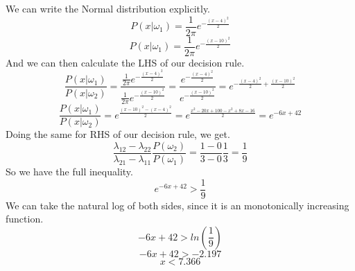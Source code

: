 \documentclass[12pt]{article}
\begin{document}
    We can write the Normal distribution explicitly.
    \[
        P(x|\omega_{1}) = \frac{1}{2\pi}e^{-\frac{(x-4)^{2}}{2}}
    \]
    \[
        P(x|\omega_{1}) = \frac{1}{2\pi}e^{-\frac{(x-10)^{2}}{2}}
    \]
    And we can then calculate the LHS of our decision rule.
    \[
        \frac{P(x|\omega_{1})}{P(x|\omega_{2})} 
        = \frac
        { \frac{1}{2\pi}e^{-\frac{(x-4)^{2}}{2}} }
        { \frac{1}{2\pi}e^{-\frac{(x-10)^{2}}{2}} }
        = \frac
        {e^{-\frac{(x-4)^{2}}{2}}}
        {e^{-\frac{(x-10)^{2}}{2}}}
        = e^{-\frac{(x-4)^{2}}{2} + \frac{(x-10)^{2}}{2} }
    \]
    \[
        \frac{P(x|\omega_{1})}{P(x|\omega_{2})}
        = e^{ \frac{(x-10)^{2} - (x-4)^{2}}{2} }
        = e^{ \frac{x^2 - 20x + 100 - x^2 + 8x - 16}{2} }
        = e^{-6x + 42}
    \]
    Doing the same for RHS of our decision rule, we get.
    \[
        \frac{ \lambda_{12} - \lambda_{22} }{ \lambda_{21} - \lambda_{11}}
        \frac{P(\omega_{2})}{P(\omega_{1})}
        = \frac{1 - 0}{3 - 0}\frac{1}{3} = \frac{1}{9}
    \]
    So we have the full inequality.
    \[
        e^{-6x + 42} > \frac{1}{9}
    \]
    We can take the natural log of both sides, since it is an 
    monotonically increasing function.
    \[
        -6x + 42 > ln(\frac{1}{9})
    \]
    \[
        -6x + 42 > -2.197
    \]
    \[
        x < 7.366
    \]
\end{document}
